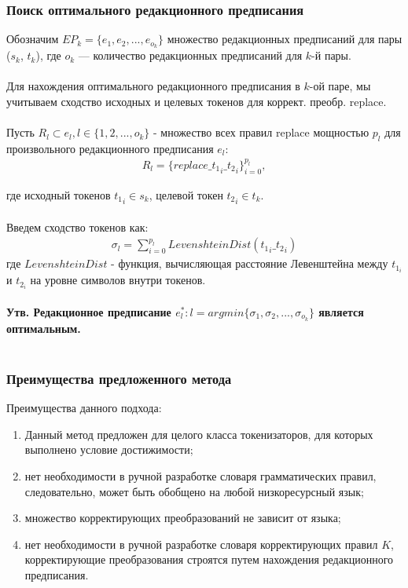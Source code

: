 \documentclass[10pt]{beamer}
\begin{document}


\begin{frame}
\frametitle{Поиск оптимального редакционного предписания}
\justifying
\begin{small}    

Обозначим $EP_k = \{e_{1}, e_{2}, ..., e_{o_k}\}  $ множество редакционных предписаний для пары ($s_k$, $t_k$), где $o_k$ --- количество редакционных предписаний для $k$-й пары. 
~\\
~\\
Для нахождения оптимального редакционного предписания в $k$-ой паре, мы учитываем сходство исходных и целевых токенов для коррект. преобр. replace.
~\\
~\\
Пусть $R_l \subset e_l, l \in \{1, 2, ..., o_k\}$ - множество всех правил replace мощностью $p_l$ для произвольного редакционного предписания $ e_l$: 
\begin{align*}
    R_l =\{replace\_{t_1}_{i}\_{t_2}_{i}\}_{i=0}^{p_l}, 
\end{align*}

где исходный токенов ${t_1}_{i} \in s_k$, целевой токен ${t_2}_{i} \in t_k$. 
~\\
~\\
Введем сходство токенов как:
\begin{align*}
    \sigma_l = \sum_{i=0}^{p_l}{LevenshteinDist({t_1}_{i}\_{t_2}_{i})}
\end{align*}
где $LevenshteinDist$ - функция, вычисляющая расстояние Левенштейна между $t_{1_i}$ и $t_{2_i}$ на уровне символов внутри токенов. \\
~\\
\textbf{Утв. Редакционное предписание $e^*_{l}: l= argmin\{\sigma_1, \sigma_2, ..., \sigma_{o_k}\} $ является оптимальным.} \\
~\\

\end{small}

\end{frame}

\begin{frame}
\frametitle{Преимущества предложенного метода}
Преимущества данного подхода:

\begin{enumerate}
\item Данный метод предложен для целого класса токенизаторов, для которых выполнено условие достижимости;
\item нет необходимости в ручной разработке словаря грамматических правил, следовательно, может быть обобщено на любой низкоресурсный язык;
\item множество корректирующих преобразований не зависит от языка;
\item нет необходимости в ручной разработке словаря корректирующих правил $K$, корректирующие преобразования строятся путем нахождения редакционного предписания.
\end{enumerate}
\end{frame}
\end{document}
